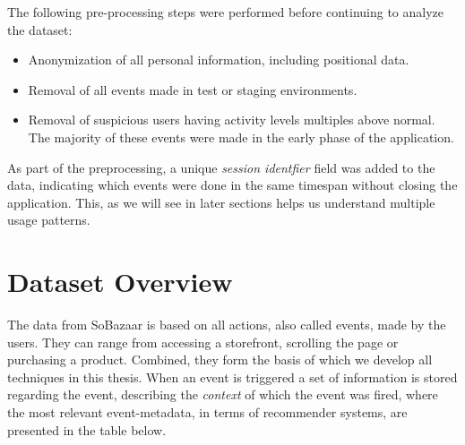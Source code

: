 The following pre-processing steps were performed before continuing to analyze
the dataset:

\begin{itemize}
  \item Anonymization of all personal information, including positional data.
  \item Removal of all events made in test or staging environments.
  \item Removal of suspicious users having activity levels multiples above
  normal. The majority of these events were made in the early phase of the
  application.
\end{itemize}

As part of the preprocessing, a unique \textit{session identfier} field was
added to the data, indicating which events were done in the same timespan
without closing the application. This, as we will see in later sections helps
us understand multiple usage patterns.

\section{Dataset Overview}

The data from SoBazaar is based on all actions, also called events, made by the
users. They can range from accessing a storefront, scrolling the page or
purchasing a product. Combined, they form the basis of which we develop all
techniques in this thesis. When an event is triggered a set of information is
stored regarding the event, describing the \textit{context} of which the event
was fired, where the most relevant event-metadata, in terms of recommender
systems, are presented in the table below.

